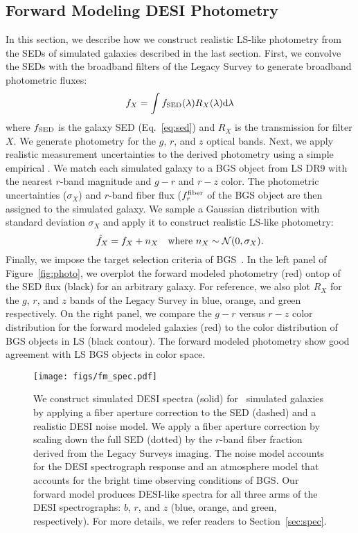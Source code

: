 \subsection{Forward Modeling DESI Photometry} \label{sec:photo} 
In this section, we describe how we construct realistic LS-like photometry
from the SEDs of simulated galaxies described in the last section.
First, we convolve the SEDs with the broadband filters of the Legacy Survey to
generate broadband photometric fluxes: 
\begin{equation}
    f_X = \int f_{\rm SED}(\lambda) R_X(\lambda) {\rm d}\lambda
\end{equation}
where $f_{\rm SED}$ is the galaxy SED (Eq.~\ref{eq:sed}) and $R_X$ is the
transmission for filter $X$. 
We generate photometry for the $g$, $r$, and $z$ optical bands.
Next, we apply realistic measurement uncertainties to the derived photometry
using a simple empirical . 
We match each simulated galaxy to a BGS object from LS DR9 with the nearest $r$-band magnitude and
$g-r$ and $r-z$ color.
The photometric uncertainties ($\sigma_X$) and $r$-band fiber flux ($f_r^{\rm
fiber}$ of the BGS object are then assigned to the simulated galaxy. 
We sample a Gaussian distribution with standard deviation $\sigma_X$ and apply
it to construct realistic LS-like photometry: 
\begin{equation}
    \hat{f}_X = f_X + n_X  \quad {\rm where}~n_X \sim \mathcal{N}(0, \sigma_X).
\end{equation} 
Finally, we impose the target selection criteria of BGS~\citep[][Hahn~\etal~in
prep.]{ruiz-macias2021}.
In the left panel of Figure~\ref{fig:photo}, we overplot the forward
modeled photometry (red) ontop of the SED flux (black) for an arbitrary \lgal
galaxy. 
For reference, we also plot $R_X$ for the $g$, $r$, and $z$ bands of the Legacy
Survey in blue, orange, and green respectively. 
On the right panel, we compare the $g - r$ versus $r - z$ color distribution
for the forward modeled \lgal galaxies (red) to the color distribution of BGS
objects in LS (black contour). 
The forward modeled photometry show good agreement with LS BGS objects in
color space.

\begin{figure}
\begin{center}
\texttt{[image: figs/fm\_spec.pdf]} \label{fig:spec}
\caption{
    We construct simulated DESI spectra (solid) for \lgal~simulated galaxies by
    applying a fiber aperture correction to the SED (dashed) and a realistic
    DESI noise model. 
    We apply a fiber aperture correction by scaling down the full SED (dotted)
    by the $r$-band fiber fraction derived from the Legacy Surveys imaging. 
    The noise model accounts for the DESI spectrograph response and an
    atmosphere model that accounts for the bright time observing conditions of
    BGS.
    Our forward model produces DESI-like spectra for all three arms of the DESI
    spectrographs: $b$, $r$, and $z$ (blue, orange, and green, respectively). 
    For more details, we refer readers to Section~\ref{sec:spec}.
    }
\end{center}
\end{figure}

